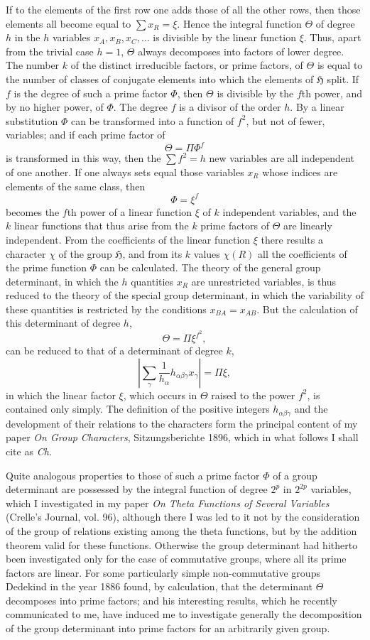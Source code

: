 \documentclass[11pt]{article}
\newcommand{\Hgrp}{\mathfrak{H}}
\begin{document}
If to the elements of the first row one adds those of all the other rows, then those elements all become equal to $\sum x_R=\xi$. Hence the integral function $\Theta$ of degree $h$ in the $h$ variables $x_A,x_B,x_C,\ldots$ is divisible by the linear function $\xi$. Thus, apart from the trivial case $h=1$, $\Theta$ always decomposes into factors of lower degree. The number $k$ of the distinct irreducible factors, or prime factors, of $\Theta$ is equal to the number of classes of conjugate elements into which the elements of $\Hgrp$ split. If $f$ is the degree of such a prime factor $\Phi$, then $\Theta$ is divisible by the $f$th power, and by no higher power, of $\Phi$. The degree $f$ is a divisor of the order $h$. By a linear substitution $\Phi$ can be transformed into a function of $f^2$, but not of fewer, variables; and if each prime factor of
\[
\Theta=\Pi \Phi^f
\]
is transformed in this way, then the $\sum f^2=h$ new variables are all independent of one another. If one always sets equal those variables $x_R$ whose indices are elements of the same class, then
\[
\Phi=\xi^f
\]
becomes the $f$th power of a linear function $\xi$ of $k$ independent variables, and the $k$ linear functions that thus arise from the $k$ prime factors of $\Theta$ are linearly independent. From the coefficients of the linear function $\xi$ there results a character $\chi$ of the group $\Hgrp$, and from its $k$ values $\chi(R)$ all the coefficients of the prime function $\Phi$ can be calculated. The theory of the general group determinant, in which the $h$ quantities $x_R$ are unrestricted variables, is thus reduced to the theory of the special group determinant, in which the variability of these quantities is restricted by the conditions $x_{BA}=x_{AB}$. But the calculation of this determinant of degree $h$,
\[
\Theta=\Pi \xi^{f^2},
\]
can be reduced to that of a determinant of degree $k$,
\[
\left|\sum_\gamma \frac{1}{h_\alpha}h_{\alpha\beta\gamma}x_\gamma\right|=\Pi\xi,
\]
in which the linear factor $\xi$, which occurs in $\Theta$ raised to the power $f^2$, is contained only simply. The definition of the positive integers $h_{\alpha\beta\gamma}$ and the development of their relations to the characters form the principal content of my paper \emph{On Group Characters}, Sitzungsberichte 1896, which in what follows I shall cite as \emph{Ch.}

Quite analogous properties to those of such a prime factor $\Phi$ of a group determinant are possessed by the integral function of degree $2^p$ in $2^{2p}$ variables, which I investigated in my paper \emph{On Theta Functions of Several Variables} (Crelle's Journal, vol. 96), although there I was led to it not by the consideration of the group of relations existing among the theta functions, but by the addition theorem valid for these functions. Otherwise the group determinant had hitherto been investigated only for the case of commutative groups, where all its prime factors are linear. For some particularly simple non-commutative groups Dedekind in the year 1886 found, by calculation, that the determinant $\Theta$ decomposes into prime factors; and his interesting results, which he recently communicated to me, have induced me to investigate generally the decomposition of the group determinant into prime factors for an arbitrarily given group.
\end{document}

